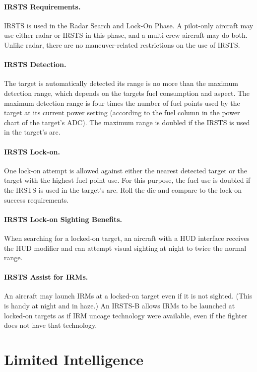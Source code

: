 \begin{advancedrules}
{\paragraph{IRSTS Requirements.}  IRSTS is used in the Radar Search and Lock-On Phase. A pilot-only aircraft may use either radar or IRSTS in this phase, and a multi-crew aircraft may do both. Unlike radar, there are no maneuver-related restrictions on the use of IRSTS.

\paragraph{IRSTS Detection.} The target is automatically detected its range is no more than the maximum detection range, which depends on the targets fuel consumption and aspect. The maximum detection range is four times the number of fuel points used by the target at its current power setting (according to the fuel column in the power chart of the target’s ADC). The maximum range is doubled if the IRSTS is used in the target’s  arc. 

\paragraph{IRSTS Lock-on.} One lock-on attempt is allowed against either the nearest detected target or the target with the highest fuel point use. For this purpose, the fuel use is doubled if the IRSTS is used in the target’s  arc. Roll the die and compare to the lock-on success requirements.

\paragraph{IRSTS Lock-on Sighting Benefits.} When searching for a locked-on target, an aircraft with a HUD interface receives the HUD modifier and can attempt visual sighting at night to twice the normal range.

\paragraph{IRSTS Assist for IRMs.} An aircraft may launch IRMs at a locked-on target even if it is not sighted. (This is handy at night and in haze.) An IRSTS-B allows IRMs to be launched at locked-on targets as if IRM uncage technology were available, even if the fighter does not have that technology.

}

\section{Limited Intelligence}
\label{rule:limited-intelligence}


\end{advancedrules}
